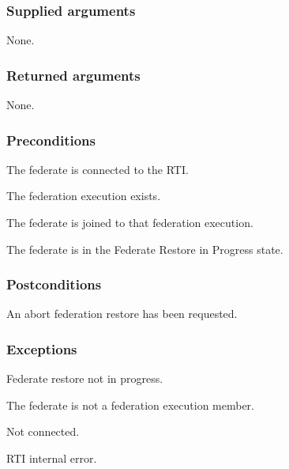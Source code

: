 \subsubsection{Supplied arguments}

\begin{stdalphalist}
    \item None.
\end{stdalphalist}

\subsubsection{Returned arguments}

\begin{stdalphalist}
    \item None.
\end{stdalphalist}

\subsubsection{Preconditions}

\begin{stdalphalist}
    \item The federate is connected to the RTI.
    \item The federation execution exists.
    \item The federate is joined to that federation execution.
    \item The federate is in the Federate Restore in Progress state.
\end{stdalphalist}

\clearpage


\subsubsection{Postconditions}

\begin{stdalphalist}
    \item An abort federation restore has been requested.
\end{stdalphalist}

\subsubsection{Exceptions}

\begin{stdalphalist}
    \item Federate restore not in progress.
    \item The federate is not a federation execution member.
    \item Not connected.
    \item RTI internal error.
\end{stdalphalist}

